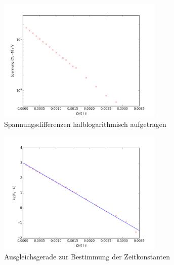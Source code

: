 \begin{figure}[h!]
	\centering
	\includegraphics[width=0.7\textwidth]{Spannung1.png}
	\caption{Spannungsdifferenzen halblogarithmisch aufgetragen}
	\label{fig:spannung1}
\end{figure} 

\begin{figure}[h!]
	\centering
	\includegraphics[width=0.7\textwidth]{Spannung2.png}
	\caption{Ausgleichsgerade zur Bestimmung der Zeitkonstanten}
	\label{fig:Spannung2}
\end{figure} 

